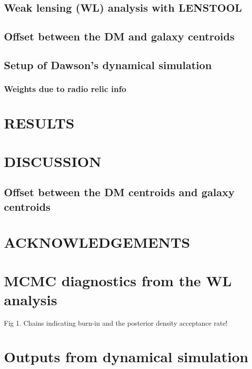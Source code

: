 \documentclass[letterpaper,useAMS,usenatbib]{mn2e}
\begin{document}
\subsection{Weak lensing (WL) analysis with LENSTOOL}


\subsection{Offset between the DM and galaxy centroids}

\subsection{Setup of Dawson's dynamical simulation}
\subsubsection{Weights due to radio relic info}

\section{RESULTS}




\section{DISCUSSION}
\subsection{Offset between the DM centroids and galaxy centroids}
\section{ACKNOWLEDGEMENTS}



\appendix
\section{MCMC diagnostics from the WL analysis}
Fig 1. Chains indicating burn-in and the posterior density 
acceptance rate!


\section{Outputs from dynamical simulation}
\clearpage\bsp\label{lastpage} 
\end{document}
